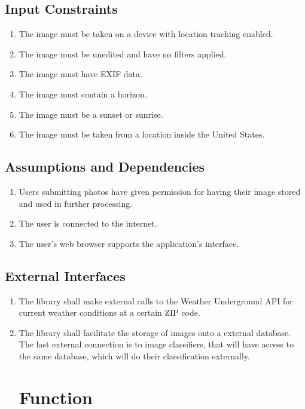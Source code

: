 \documentclass[journal,10pt,draftclsnofoot,onecolumn]{IEEEtran}
\begin{document}
\begin{singlespace}
	\subsection{Input Constraints}
		\begin{enumerate}
			\item The image must be taken on a device with location tracking enabled.
			\item The image must be unedited and have no filters applied.
			\item The image must have EXIF data.
			\item The image must contain a horizon.
			\item The image must be a sunset or sunrise.
			\item The image must be taken from a location inside the United States.
		\end{enumerate}

	\subsection{Assumptions and Dependencies}
		\begin{enumerate}
			\item Users submitting photos have given permission for having their image stored and used in further processing.
			\item The user is connected to the internet.
			\item The user's web browser supports the application's interface.
		\end{enumerate}

	\subsection{External Interfaces}
		\begin{enumerate}
			\item The library shall make external calls to the Weather Underground API for current weather conditions at a certain ZIP code.
			\item The library shall facilitate the storage of images onto a external database.\\

		The last external connection is to image classifiers, that will have access to the same database, which will do their classification externally.

\clearpage

\section{Function}

\end{enumerate}
\end{singlespace}
\end{document}
